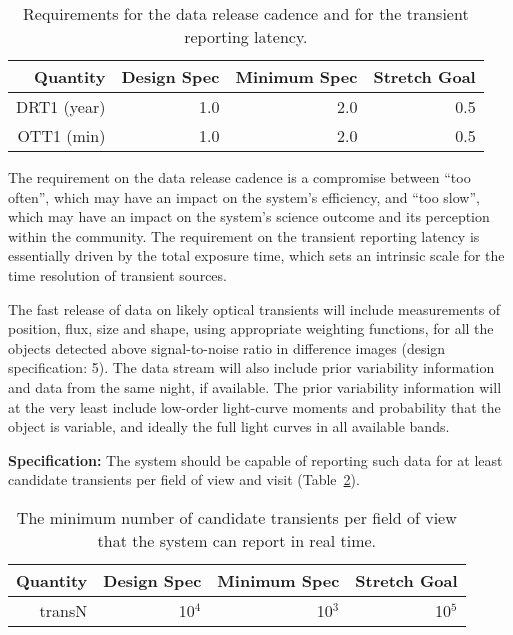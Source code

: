 \begin{table}[h]
\begin{tabular}{|r|r|r|r|}
\hline
     Quantity         &   Design Spec & Minimum Spec  & Stretch Goal   \\
\hline
    DRT1 (year)       &       1.0     &      2.0      &       0.5     \\
    OTT1 (min)        &       1.0     &      2.0      &       0.5     \\
\hline
\end{tabular}
\caption{Requirements for the data release cadence and for the transient
reporting latency.}
\label{TDMcadence}
\end{table}

The requirement on the data release cadence is a compromise between ``too
often'', which may have an impact on the system's efficiency, and ``too
slow'', which may have an impact on the system's science outcome and its
perception within the community.  The requirement on the transient
reporting latency is essentially driven by the total exposure time, which
sets an intrinsic scale for the time resolution of transient sources.

The fast release of data on likely optical transients will include
measurements of position, flux, size and shape, using appropriate
weighting functions, for all the objects detected above
signal-to-noise ratio in difference images (design specification: 5).
The data stream will also include prior variability information and
data from the same night, if available. The prior variability
information will at the very least include low-order light-curve moments
and probability that the object is variable, and ideally the full
light curves in all available bands.

{\bf Specification:} The system should be capable of reporting such data for
at least    candidate transients per
field of view and visit (Table~\ref{transN}).
\begin{table}[h]
\begin{tabular}{|r|r|r|r|}
\hline
     Quantity         &   Design Spec & Minimum Spec  & Stretch Goal   \\
\hline
    transN              &       10$^4$    &      10$^3$      &       10$^5$     \\
\hline
\end{tabular}
\caption{The minimum number of candidate transients per field
of view that the system can report in real time.}
\label{transN}
\end{table}

